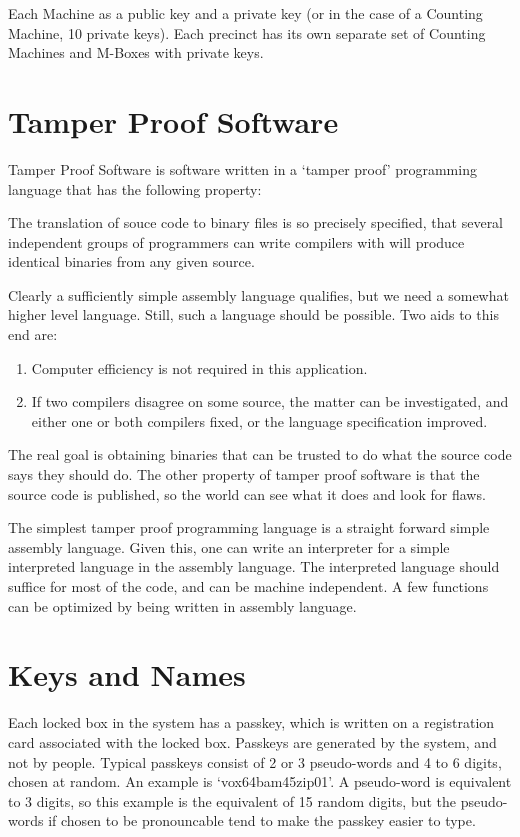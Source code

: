 \documentclass[12pt]{article}
\newenvironment{indpar}[1][0.3in]%
	{\begin{list}{}%
		     {\setlength{\itemsep}{0in}%
		      \setlength{\topsep}{0in}%
		      \setlength{\parsep}{1ex}%
		      \setlength{\labelwidth}{#1}%
		      \setlength{\leftmargin}{#1}%
		      \addtolength{\leftmargin}{\labelsep}}%
	 \item}%
	{\end{list}}
\begin{document}
Each Machine as a public key and a private key (or in the
case of a Counting Machine, 10 private keys).  Each precinct
has its own separate set of Counting Machines and M-Boxes with
private keys.

\section{Tamper Proof Software}

Tamper Proof Software is software written in a `tamper proof'
programming language
that has the following property:
\begin{indpar}
The translation of souce code to binary files is so precisely
specified, that several independent groups of programmers can
write compilers with will produce identical binaries from any
given source.
\end{indpar}

Clearly a sufficiently simple assembly language qualifies, but
we need a somewhat higher level language.  Still, such a language
should be possible.  Two aids to this end are:
\begin{enumerate}
\item
Computer efficiency is not required in this application.

\item
If two compilers disagree on some source, the matter can be
investigated, and either one or both compilers fixed, or the
language specification improved.
\end{enumerate}

The real goal is obtaining binaries that can be trusted to
do what the source code says they should do.  The other
property of tamper proof software is that the source code
is published, so the world can see what it does and look
for flaws.

The simplest tamper proof programming language is a straight
forward simple assembly language.  Given this, one can write
an interpreter for a simple interpreted language in the
assembly language.  The interpreted language should suffice
for most of the code, and can be machine independent.
A few functions can be optimized by being written in assembly
language.

\section{Keys and Names}

Each locked box in the system has a passkey, which is
written on a registration card associated with the locked
box.  Passkeys are generated by the system, and not by
people.  Typical passkeys consist of 2 or 3 pseudo-words
and 4 to 6 digits, chosen at random.  An example is
`vox64bam45zip01'.  A pseudo-word is equivalent to 3
digits, so this example is the equivalent of 15 random
digits, but the pseudo-words if chosen to be pronouncable
tend to make the passkey easier to type.
\end{document}
